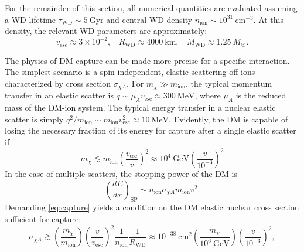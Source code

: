\documentclass[preprintnumbers,amsmath,amssymb,prd,superscriptaddress]{revtex4}
\newcommand{\GeV}{\text{GeV}}
\newcommand{\MeV}{\text{MeV}}
\newcommand{\cm}{\text{cm}}
\def\r{\right)}
\def\l{\left(}
\begin{document}
For the remainder of this section, all numerical quantities are evaluated assuming a WD lifetime $\tau_\text{WD} \sim 5 ~\text{Gyr}$ and central WD density $n_\text{ion} \sim 10^{31} ~\cm^{-3}$. 
At this density, the relevant WD parameters are approximately: 
\begin{equation}
v_\text{esc} \approx 3 \times 10^{-2}, ~~~~ R_\text{WD} \approx 4000 ~\text{km}, ~~~~ M_\text{WD} \approx 1.25 ~M_{\astrosun}. 
\end{equation}

The physics of DM capture can be made more precise for a specific interaction.
The simplest scenario is a spin-independent, elastic scattering off ions characterized by cross section $\sigma_{\chi A}$. 
For $m_\chi \gg m_\text{ion}$, the typical momentum transfer in an elastic scatter is $q \sim \mu_{A} v_\text{esc} \approx 300 ~\MeV$, where $\mu_{A}$ is the reduced mass of the DM-ion system. 
The typical energy transfer in a nuclear elastic scatter is simply $q^2/m_\text{ion} \sim m_\text{ion} v_\text{esc}^2 \approx 10 ~\MeV$. 
Evidently, the DM is capable of losing the necessary fraction of its energy for capture after a single elastic scatter if
\begin{equation}
m_\chi \lesssim m_\text{ion} \l \frac{v_\text{esc}}{v} \r^2 \approx 10^4 ~\GeV \l \frac{v}{10^{-3}} \r^2
\end{equation}
In the case of multiple scatters, the stopping power of the DM is
\begin{equation}
\left( \frac{d E}{d x} \right)_\text{SP} \sim n_\text{ion} \sigma_{\chi A} m_\text{ion} v^2.
\end{equation}
Demanding \eqref{eq:capture} yields a condition on the DM elastic nuclear cross section sufficient for capture:
\begin{equation}
\label{eq:capturecross}
\sigma_{\chi A} \gtrsim  \l \frac{m_\chi}{m_\text{ion}} \r \l \frac{v}{v_\text{esc}} \r^2 \frac{1}{n_\text{ion}} \frac{1}{R_\text{WD}} \approx 10^{-38} ~\cm^2 \l \frac{m_\chi}{10^6 ~\GeV} \r \l \frac{v}{10^{-3}} \r^2,
\end{equation}
\end{document}
